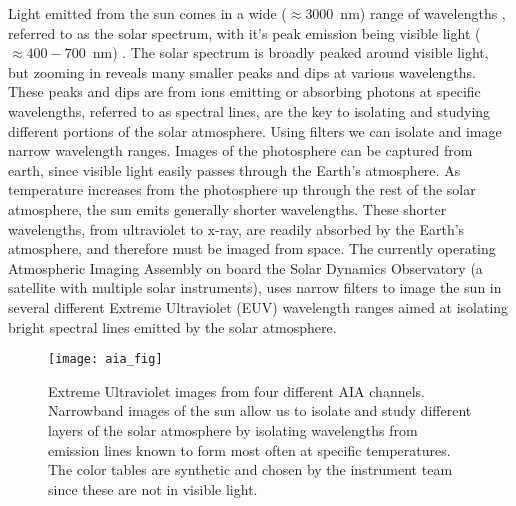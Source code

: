 Light emitted from the sun comes in a wide ($\approx3000$\, nm) range of wavelengths , referred to as the solar spectrum, with it's peak emission being visible light ($\approx400-700$\, nm) \citep{JudgeBook}.
The solar spectrum is broadly peaked around visible light, but zooming in reveals many smaller peaks and dips at various wavelengths.  
These peaks and dips are from ions emitting or absorbing photons at specific wavelengths, referred to as spectral lines, are the key to isolating and studying different portions of the solar atmosphere.
Using filters we can isolate and image narrow wavelength ranges.
Images of the photosphere can be captured from earth, since visible light easily passes through the Earth's atmosphere.
As temperature increases from the photosphere up through the rest of the solar atmosphere, the sun emits generally shorter wavelengths.  
These shorter wavelengths, from ultraviolet to x-ray, are readily absorbed by the Earth's atmosphere, and therefore must be imaged from space. 
The currently operating Atmospheric Imaging Assembly \citep[AIA:][]{Lemen2012} on board the Solar Dynamics Observatory (a satellite with multiple solar instruments), uses narrow filters to image the sun in several different Extreme Ultraviolet (EUV) wavelength ranges aimed at isolating bright spectral lines emitted by the solar atmosphere.
\begin{figure}
	\texttt{[image: aia\_fig]}
	\caption{Extreme Ultraviolet images from four different AIA channels. Narrowband images of the sun allow us to isolate and study different layers of the solar atmosphere by isolating wavelengths from emission lines known to form most often at specific temperatures. The color tables are synthetic and chosen by the instrument team since these are not in visible light. }
	\label{fig:AIA}
\end{figure}
